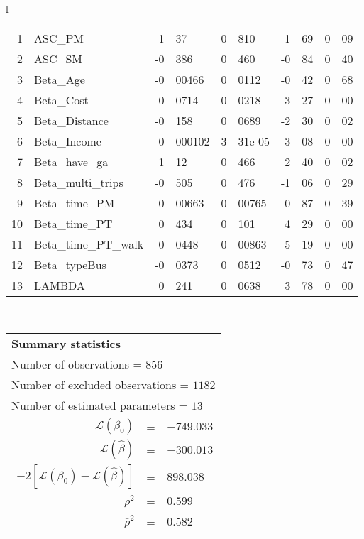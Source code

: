 \begin{tabular}{l}
\begin{tabular}{rlr@{.}lr@{.}lr@{.}lr@{.}l}
1 & ASC_PM  & 1&37 & 0&810 & 1&69 & 0&09\\
2 & ASC_SM & -0&386 & 0&460 & -0&84 & 0&40\\
3 & Beta_Age & -0&00466 & 0&0112 & -0&42 & 0&68\\
4 & Beta_Cost & -0&0714 & 0&0218 & -3&27 & 0&00\\
5 & Beta_Distance & -0&158 & 0&0689 & -2&30 & 0&02\\
6 & Beta_Income & -0&000102 & 3&31e-05 & -3&08 & 0&00\\
7 & Beta_have_ga & 1&12 & 0&466 & 2&40 & 0&02\\
8 & Beta_multi_trips & -0&505 & 0&476 & -1&06 & 0&29\\
9 & Beta_time_PM & -0&00663 & 0&00765 & -0&87 & 0&39\\
10 & Beta_time_PT & 0&434 & 0&101 & 4&29 & 0&00\\
11 & Beta_time_PT_walk & -0&0448 & 0&00863 & -5&19 & 0&00\\
12 & Beta_typeBus & -0&0373 & 0&0512 & -0&73 & 0&47\\
13 & LAMBDA & 0&241 & 0&0638 & 3&78 & 0&00\\
\hline
\end{tabular}
\\
\begin{tabular}{rcl}
\multicolumn{3}{l}{\bf Summary statistics}\\
\multicolumn{3}{l}{ Number of observations = $856$} \\
\multicolumn{3}{l}{ Number of excluded observations = $1182$} \\
\multicolumn{3}{l}{ Number of estimated  parameters = $13$} \\
 $\mathcal{L}(\beta_0)$ &=&  $-749.033$ \\
 $\mathcal{L}(\hat{\beta})$ &=& $-300.013 $  \\
 $-2[\mathcal{L}(\beta_0) -\mathcal{L}(\hat{\beta})]$ &=& $898.038$ \\
    $\rho^2$ &=&   $0.599$ \\
    $\bar{\rho}^2$ &=&    $0.582$ \\
\end{tabular}
  \end{tabular}
